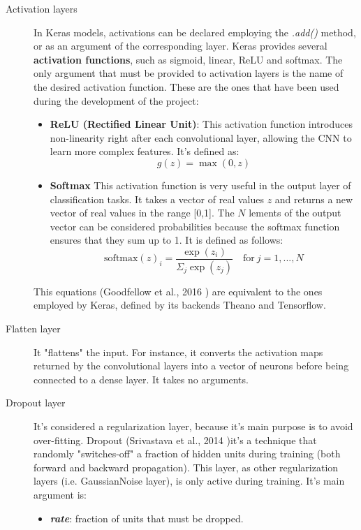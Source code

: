 \begin{description}
	\item[Activation layers] In Keras models, activations can be declared employing the \textit{.add()} method, or as an argument of the corresponding layer. Keras provides several \textbf{activation functions}, such as sigmoid, linear, ReLU and softmax. The only argument that must be provided to activation layers is the name of the desired activation function. These are the ones that have been used during the development of the project:
	\begin{itemize}
		\item \textbf{ReLU (Rectified Linear Unit)}: This activation function introduces non-linearity right after each convolutional layer, allowing the CNN to learn more complex features. It's defined as:
		\begin{equation}
		g(z)=\max(0,z)
		\end{equation}
		\item \textbf{Softmax} This activation function is very useful in the output layer of classification tasks. It takes a vector of real values $z$ and returns a new vector of real values in the range [0,1]. The $N$ lements of the output vector can be considered probabilities because the softmax function ensures that they sum up to 1. It is defined as follows:
		\begin{equation}
		\mathrm{softmax}(z)_i=\frac{\exp(z_i)}{\Sigma_{j}{\exp(z_j)}} \quad \mathrm{for} \ j=1, ...,N
		\end{equation}
	\end{itemize}
	This equations (Goodfellow et al., 2016 \cite{Goodfellow-et-al-2016}) are equivalent to the ones employed by Keras, defined by its backends Theano and Tensorflow.
\end{description}
\begin{description}
	\item[Flatten layer] It "flattens" the input. For instance, it converts the activation maps returned by the convolutional layers into a vector of neurons before being connected to a dense layer. It takes no arguments.
\end{description}
\begin{description}
	\item[Dropout layer] It's considered a regularization layer, because it's main purpose is to avoid over-fitting. Dropout (Srivastava et al., 2014 \cite{Srivastava-et-al-2014})it's a technique that randomly "switches-off" a fraction of hidden units during training (both forward and backward propagation). This layer, as other regularization layers (i.e. GaussianNoise layer), is only active during training. It's main argument is:
	\begin{itemize}
		\item \textbf{\textit{rate}}: fraction of units that must be dropped.
	\end{itemize}
\end{description}
